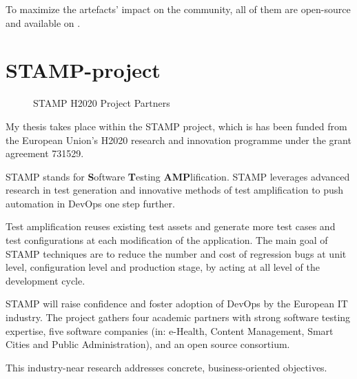 To maximize the artefacts' impact on the community, all of them are open-source and available on \gh.

\section{STAMP-project}
\label{sec:intro:stamp}

\begin{figure}[h]
	\centering
	\caption{STAMP H2020 Project Partners}
	\label{fig:intro:partners-map}
\end{figure}

My thesis takes place within the STAMP project, which is has been funded from the European Union's H2020 research and innovation programme under the grant agreement 731529.

STAMP stands for \textbf{S}oftware \textbf{T}esting \textbf{AMP}lification.
STAMP leverages advanced research in test generation and innovative methods of test amplification to push automation in DevOps one step further.

Test amplification reuses existing test assets and generate more test cases and test configurations at each modification of the application.
The main goal of STAMP techniques are to reduce the number and cost of regression bugs at unit level, configuration level and production stage, by acting at all level of the development cycle.

STAMP will raise confidence and foster adoption of DevOps by the European IT industry.
The project gathers four academic partners with strong software testing expertise, five software companies (in: e-Health, Content Management, Smart Cities and Public Administration), and an open source consortium. 

This industry-near research addresses concrete, business-oriented objectives.

